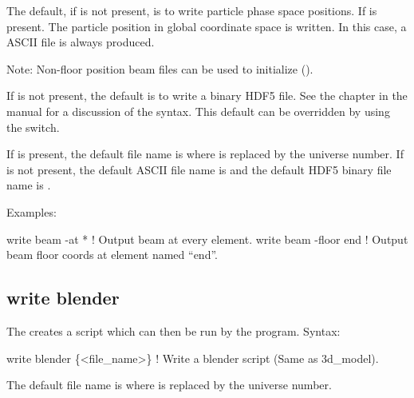 {{{{{{{{{{{The default, if  is not present, is to write particle phase space positions.
If  is present. The particle position in global coordinate space is written.
In this case, a ASCII file is always produced.

Note: Non-floor position beam files can be used to initialize \tao ().

If  is not present, the default is to write a binary HDF5 file. See the  chapter in the \bmad manual for a discussion of the syntax. This default can be overridden
by using the  switch.

If  is present, the default file name is  where \vn{\#} is
replaced by the universe number. If  is not present, the default ASCII file name
is  and the default HDF5 binary file name is .

Examples:
\begin{example}
  write beam -at *        ! Output beam at every element.
  write beam -floor end   ! Output beam floor coords at element named ``end''.
\end{example}


\subsection{write blender}
\label{s:write.blender}

The  creates a script which can then be run by
the  program\cite{b:blender}. Syntax:
\begin{example}
    write blender \{<file_name>\}            ! Write a blender script (Same as 3d_model).
\end{example}

The default file name is  where \vn{\#} is replaced by the universe number. 

}}}}}}}}}}}
